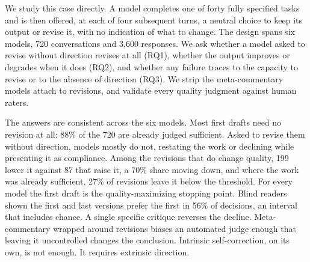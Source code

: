 We study this case directly. A model completes one of forty fully specified tasks and is
then offered, at each of four subsequent turns, a neutral choice to keep its output or
revise it, with no indication of what to change. The design spans six models, 720
conversations and 3,600 responses. We ask whether a model asked to revise without direction
revises at all (RQ1), whether the output improves or degrades when it does (RQ2), and
whether any failure traces to the capacity to revise or to the absence of direction (RQ3).
We strip the meta-commentary models attach to revisions, and validate every quality
judgment against human raters.

The answers are consistent across the six models. Most first drafts need no revision at
all: 88\% of the 720 are already judged sufficient. Asked to revise them without direction,
models mostly do not, restating the work or declining while presenting it as compliance.
Among the revisions that do change quality, 199 lower it against 87 that raise it, a 70\%
share moving down, and where the work was already sufficient, 27\% of revisions leave it
below the threshold. For every model the first draft is the quality-maximizing stopping
point. Blind readers shown the first and last versions prefer the first in 56\% of
decisions, an interval that includes chance. A single specific critique reverses the
decline. Meta-commentary wrapped around revisions biases an automated judge enough that
leaving it uncontrolled changes the conclusion. Intrinsic self-correction, on its own, is
not enough. It requires extrinsic direction.
